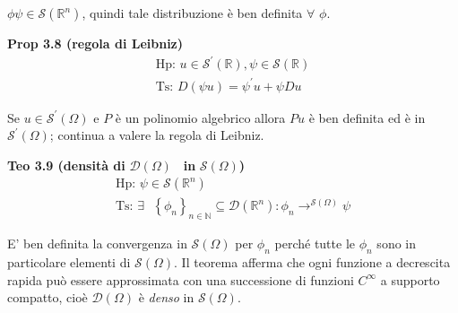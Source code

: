 \documentclass{article}
\begin{document}
$\phi \psi \in \mathcal{S}\left( 
\mathbb{R}
^{n}\right) $, quindi tale distribuzione \`{e} ben definita $\forall $ $\phi 
$.

\textbf{Prop 3.8 (regola di Leibniz)}%
\begin{gather*}
\text{Hp: }u\in \mathcal{S}^{\prime }\left( 
\mathbb{R}
\right) ,\psi \in \mathcal{S}\left( 
\mathbb{R}
\right) \\
\text{Ts: }D\left( \psi u\right) =\psi ^{\prime }u+\psi Du
\end{gather*}

Se $u\in \mathcal{S}^{\prime }\left( \Omega \right) $ e $P$ \`{e} un
polinomio algebrico allora $Pu$ \`{e} ben definita ed \`{e} in $\mathcal{S}%
^{\prime }\left( \Omega \right) $; continua a valere la regola di Leibniz.

\textbf{Teo 3.9 (densit\`{a} di }$\mathcal{D}\left( \Omega \right) $\textbf{%
\ in }$\mathcal{S}\left( \Omega \right) $\textbf{)}%
\begin{gather*}
\text{Hp}\text{: }\psi \in \mathcal{S}\left( 
\mathbb{R}
^{n}\right) \\
\text{Ts}\text{: }\exists \text{ }\left\{ \phi _{n}\right\} _{n\in 
\mathbb{N}
}\subseteq \mathcal{D}\left( 
\mathbb{R}
^{n}\right) :\phi _{n}\rightarrow ^{\mathcal{S}\left( \Omega \right) }\psi
\end{gather*}

E' ben definita la convergenza in $\mathcal{S}\left( \Omega \right) $ per $%
\phi _{n}$ perch\'{e} tutte le $\phi _{n}$ sono in particolare elementi di $%
\mathcal{S}\left( \Omega \right) $. Il teorema afferma che ogni funzione a
decrescita rapida pu\`{o} essere approssimata con una successione di
funzioni $C^{\infty }$ a supporto compatto, cio\`{e} $\mathcal{D}\left(
\Omega \right) $ \`{e} \textit{denso} in $\mathcal{S}\left( \Omega \right) $.
\end{document}
